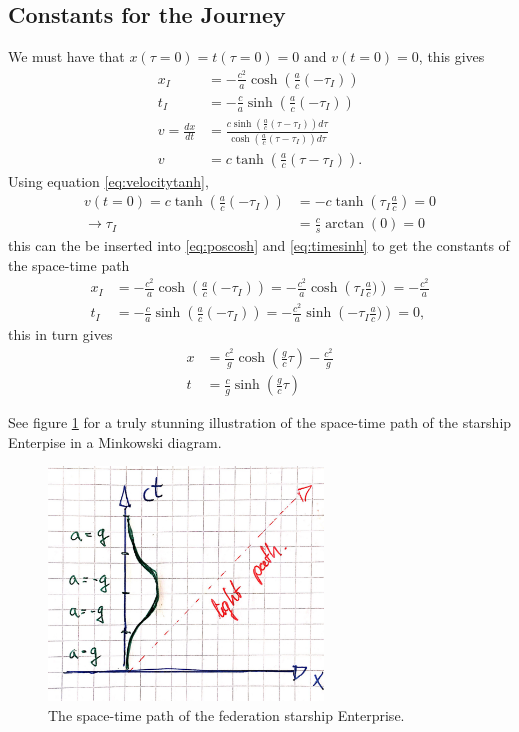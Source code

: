 \documentclass[11pt]{amsart}
\begin{document}
\subsection{Constants for the Journey}
We must have that $x(\tau=0)=t(\tau=0)=0$ and $v(t=0)=0$, this gives
\begin{align}
x_I &= -\frac{c^2}{a}\cosh\left(\frac{a}{c}(- \tau_I) \right) \label{eq:poscosh} \\
t_I &= -\frac{c}{a}\sinh\left(\frac{a}{c}(- \tau_I) \right) \label{eq:timesinh} \\
v = \frac{dx}{dt} &= \frac{c\sinh\left(\frac{a}{c}(\tau - \tau_I) \right)d\tau}{\cosh\left(\frac{a}{c}(\tau - \tau_I) \right)d\tau} \nonumber \\ 
v	&= c\tanh\left(\frac{a}{c}(\tau - \tau_I) \right) \label{eq:velocitytanh}.
\end{align}
Using equation \ref{eq:velocitytanh},
\begin{align}
v(t=0) = c\tanh\left(\frac{a}{c}(- \tau_I) \right) &= -c\tanh \left(\tau_I\frac{a}{c} \right) = 0 \nonumber \\
\rightarrow \tau_I &= \frac{c}{s}\arctan(0) = 0
\end{align}
this can the be inserted into \ref{eq:poscosh} and \ref{eq:timesinh} to get the constants of the space-time path
\begin{align}
x_I &= -\frac{c^2}{a}\cosh\left(\frac{a}{c}(- \tau_I) \right) = -\frac{c^2}{a}\cosh\left( \tau_I\frac{a}{c}) \right) = -\frac{c^2}{a} \\
t_I &= -\frac{c}{a}\sinh\left(\frac{a}{c}(- \tau_I) \right) = -\frac{c^2}{a}\sinh\left( -\tau_I\frac{a}{c}) \right) = 0,
\end{align}
this in turn gives
\begin{align}
x &= \frac{c^2}{g}\cosh\left(\frac{g}{c}\tau\right) - \frac{c^2}{g} \\
t &= \frac{c}{g}\sinh\left(\frac{g}{c}\tau \right)
\end{align}

See figure \ref{fig:spacetimepath} for a truly stunning illustration of the space-time path of the starship Enterpise in a Minkowski diagram.

\begin{figure}
\centering
	\includegraphics[width = 0.65\textwidth]{enterprise.jpg}
	\caption{The space-time path of the federation starship Enterprise.}
	\label{fig:spacetimepath}
\end{figure}
\end{document}
